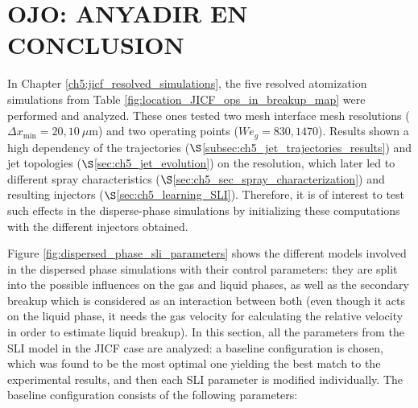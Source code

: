 \clearpage






\section{OJO: ANYADIR EN CONCLUSION}


In Chapter \ref{ch5:jicf_resolved_simulations}, the five resolved atomization simulations from Table \ref{fig:location_JICF_ops_in_breakup_map} were performed and analyzed. These ones tested two mesh interface mesh resolutions ($\Delta x_\mathrm{min} = 20, 10~\mu$m) and two operating points ($We_g = 830, 1470$). Results shown a high dependency of the trajectories ($\S$\ref{subsec:ch5_jet_trajectories_results}) and jet topologies ($\S$\ref{sec:ch5_jet_evolution}) on the resolution, which later led to different spray characteristics ($\S$\ref{sec:ch5_sec_spray_characterization}) and resulting injectors ($\S$\ref{sec:ch5_learning_SLI}). Therefore, it is of interest to test such effects in the disperse-phase simulations by initializing these computations with the different injectors obtained.

Figure \ref{fig:dispersed_phase_sli_parameters} shows the different models involved in the dispersed phase simulations with their control parameters: they are split into the possible influences on the gas and liquid phases, as well as the secondary breakup which is considered as an interaction between both (even though it acts on the liquid phase, it needs the gas velocity for calculating the relative velocity in order to estimate liquid breakup). In this section, all the parameters from the SLI model in the JICF case are analyzed: a baseline configuration is chosen, which was found to be the most optimal one yielding the best match to the experimental results, and then each SLI parameter is modified individually. The baseline configuration consists of the following parameters:


